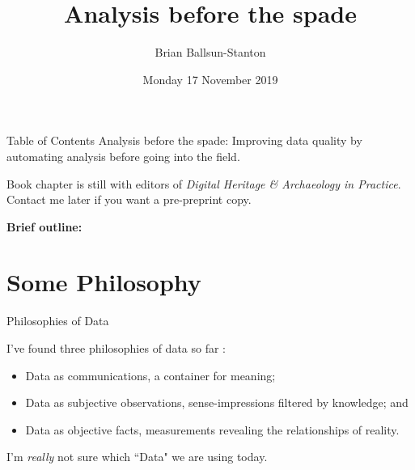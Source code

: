 \documentclass[aspectratio=1610, 11pt]{beamer} %
\title{Analysis before the spade} %
\author{Brian Ballsun-Stanton}               %
\institute{Faculty of Arts}         %
\date{Monday 17 November 2019}                 %
\begin{document}

\maketitle

  

\begin{frame}{Table of Contents}
Analysis before the spade: Improving data quality by automating
analysis before going into the field.

Book chapter is still with editors of \textit{Digital Heritage \& Archaeology in Practice}. Contact me later if you want a pre-preprint copy.

\textbf{Brief outline:}

  \tableofcontents
\end{frame}


\section{Some Philosophy}

\begin{frame}{Philosophies of Data}

I've found three philosophies of data so far \cite{Ballsun-Stanton2010-cn}:

\begin{itemize}[label=\textbullet]
\item Data as communications, a container for meaning; 
\item Data as subjective observations, sense-impressions filtered by knowledge; and 
\item Data as objective facts, measurements revealing the
relationships of reality.
\end{itemize} 

I'm \textit{really} not sure which ``Data" we are using today.
\end{frame}
\end{document}
